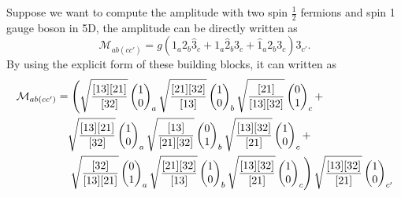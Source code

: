 \documentclass[12pt]{article}
\begin{document}
\hspace*{2em}Suppose we want to compute the amplitude with two spin $\frac{1}{2}$ fermions and spin 1 gauge boson in 5D, the amplitude can be directly written as 
\begin{equation}
    \mathcal{M}_{ab(cc')}=g(1_a2_b\hat{3}_c+1_a\hat{2}_b3_c+\hat{1}_a2_b3_c)3_{c'}.
\end{equation}
By using the explicit form of these building blocks, it can written as 
\begin{align}
    \mathcal{M}_{ab(cc')}&=\left(
        \sqrt{\frac{[13][21]}{[32]}}\begin{pmatrix}
        1\\
        0
    \end{pmatrix}_a \sqrt{\frac{[21][32]}{[13]}}\begin{pmatrix}
        1\\
        0
    \end{pmatrix}_b\sqrt{\frac{[21]}{[13][32]}}\begin{pmatrix}
        0\\
        1
    \end{pmatrix}_c +\right.\notag \\
    &\quad   \sqrt{\frac{[13][21]}{[32]}}\begin{pmatrix}
        1\\
        0
    \end{pmatrix}_a\sqrt{\frac{[13]}{[21][32]}}\begin{pmatrix}
        0\\
        1
    \end{pmatrix}_b\sqrt{\frac{[13][32]}{[21]}}\begin{pmatrix}
        1\\
        0
    \end{pmatrix}_c+\notag \\
    &\quad  \left. \sqrt{\frac{[32]}{[13][21]}}\begin{pmatrix}
        0\\
        1
    \end{pmatrix}_a\sqrt{\frac{[21][32]}{[13]}}\begin{pmatrix}
        1\\
        0
    \end{pmatrix}_b\sqrt{\frac{[13][32]}{[21]}}\begin{pmatrix}
        1\\
        0
    \end{pmatrix}_c 
    \right)\sqrt{\frac{[13][32]}{[21]}}\begin{pmatrix}
        1\\
        0
    \end{pmatrix}_{c'}
\end{align}
\end{document}
